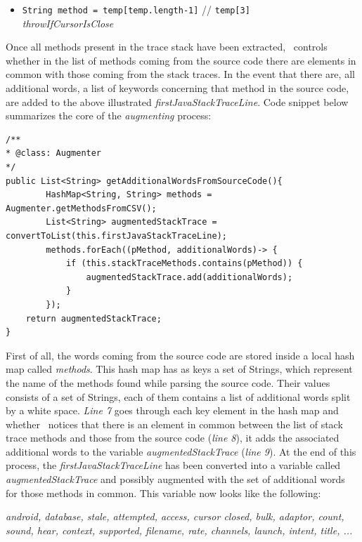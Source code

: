 \begin{enumerate}
\begin{itemize}
\item \texttt{String method = temp[temp.{\color{blue}length}-1]}
{\color{brown}// {\small \texttt{temp[3]} }}\\
\emph{throwIfCursorIsClose}

\end{itemize}
Once all methods present in the trace stack have been extracted, \toolname\ controls whether in the list of methods coming from the source code there are elements in common with those coming from the stack traces. 
In the event that there are, all additional words, \ie a list of keywords concerning that method in the source code, are added to the above illustrated \textit{firstJavaStackTraceLine}. 
Code snippet below summarizes the core of the \textit{augmenting} process: 
\begin{lstlisting}[caption=Augmenting a stack trace with methods coming from the source code,label={lst: sourcecode}]
/**
* @class: Augmenter
*/
public List<String> getAdditionalWordsFromSourceCode(){
		HashMap<String, String> methods = Augmenter.getMethodsFromCSV();
		List<String> augmentedStackTrace = convertToList(this.firstJavaStackTraceLine);
		methods.forEach((pMethod, additionalWords)-> {
			if (this.stackTraceMethods.contains(pMethod)) {
				augmentedStackTrace.add(additionalWords);
			}
		});
    return augmentedStackTrace;
}
\end{lstlisting}
First of all, the words coming from the source code are stored inside a local hash map called \textit{methods}.
This hash map has as keys a set of Strings, which represent the name of the methods found while parsing the source code. 
Their values consists of a set of Strings, each of them contains a list of additional words split by a white space.  
\textit{Line 7} goes through each key element in the hash map and whether \toolname\ notices that there is an element in common between the list of stack trace methods and those from the source code (\textit{line 8}), it adds the associated additional words to the variable \textit{augmentedStackTrace} (\textit{line 9}).
At the end of this process, the \textit{firstJavaStackTraceLine} has been converted into a variable called \textit{augmentedStackTrace} and possibly augmented with the set of additional words for those methods in common. This variable now looks like the following: 
\begin{center}
\smallbreak
\emph{\small android, database, stale, attempted, access, cursor closed, bulk, adaptor, count, \\{\color{red}sound, hear, context, supported, filename, rate, channels, launch, intent, title}, ... }
\end{center} 
\end{enumerate}

